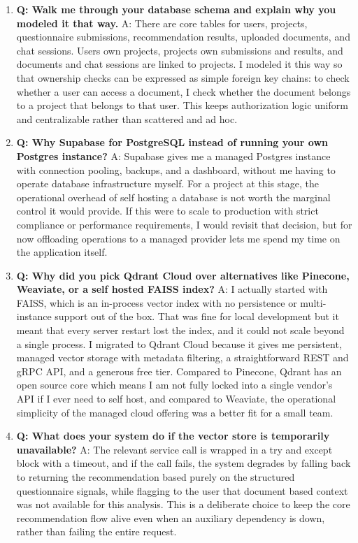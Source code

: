 \documentclass[11pt,a4paper]{report}
\begin{document}
\begin{enumerate}[leftmargin=*]
\item \textbf{Q: Walk me through your database schema and explain why you modeled it that way.}
A: There are core tables for users, projects, questionnaire submissions, recommendation results, uploaded documents, and chat sessions. Users own projects, projects own submissions and results, and documents and chat sessions are linked to projects. I modeled it this way so that ownership checks can be expressed as simple foreign key chains: to check whether a user can access a document, I check whether the document belongs to a project that belongs to that user. This keeps authorization logic uniform and centralizable rather than scattered and ad hoc.

\item \textbf{Q: Why Supabase for PostgreSQL instead of running your own Postgres instance?}
A: Supabase gives me a managed Postgres instance with connection pooling, backups, and a dashboard, without me having to operate database infrastructure myself. For a project at this stage, the operational overhead of self hosting a database is not worth the marginal control it would provide. If this were to scale to production with strict compliance or performance requirements, I would revisit that decision, but for now offloading operations to a managed provider lets me spend my time on the application itself.

\item \textbf{Q: Why did you pick Qdrant Cloud over alternatives like Pinecone, Weaviate, or a self hosted FAISS index?}
A: I actually started with FAISS, which is an in-process vector index with no persistence or multi-instance support out of the box. That was fine for local development but it meant that every server restart lost the index, and it could not scale beyond a single process. I migrated to Qdrant Cloud because it gives me persistent, managed vector storage with metadata filtering, a straightforward REST and gRPC API, and a generous free tier. Compared to Pinecone, Qdrant has an open source core which means I am not fully locked into a single vendor's API if I ever need to self host, and compared to Weaviate, the operational simplicity of the managed cloud offering was a better fit for a small team.

\item \textbf{Q: What does your system do if the vector store is temporarily unavailable?}
A: The relevant service call is wrapped in a try and except block with a timeout, and if the call fails, the system degrades by falling back to returning the recommendation based purely on the structured questionnaire signals, while flagging to the user that document based context was not available for this analysis. This is a deliberate choice to keep the core recommendation flow alive even when an auxiliary dependency is down, rather than failing the entire request.


\end{enumerate}
\end{document}
